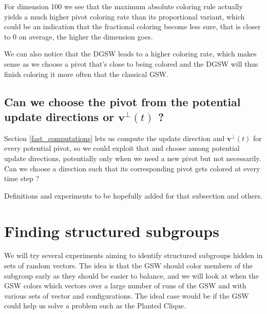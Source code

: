 \documentclass[12pt]{article}
\begin{document}
For dimension 100 we see that the maximum absolute coloring rule actually yields a much higher pivot coloring rate than its proportional variant, which could be an indication that the fractional coloring become less sure, that is closer to 0 on average, the higher the dimension goes.

We can also notice that the DGSW leads to a higher coloring rate, which makes sense as we choose a pivot that's close to being colored and the DGSW will thus finish coloring it more often that the classical GSW.

\subsection{Can we choose the pivot from the potential update directions or $\textbf{v}^\perp(t)$ ?}
Section \ref{fast_computations} lets us compute the update direction and $\textbf{v}^\perp(t)$ for every potential pivot, so we could exploit that and choose among potential update directions, potentially only when we need a new pivot but not necessarily. Can we choose a direction such that its corresponding pivot gets colored at every time step ?

Definitions and experiments to be hopefully added for that subsection and others.

\section{Finding structured subgroups}
We will try several experiments aiming to identify structured subgroups hidden in sets of random vectors. The idea is that the GSW should color members of the subgroup early as they should be easier to balance, and we will look at when the GSW colors which vectors over a large number of runs of the GSW and with various sets of vector and configurations. The ideal case would be if the GSW could help us solve a problem such as the Planted Clique.
\end{document}
